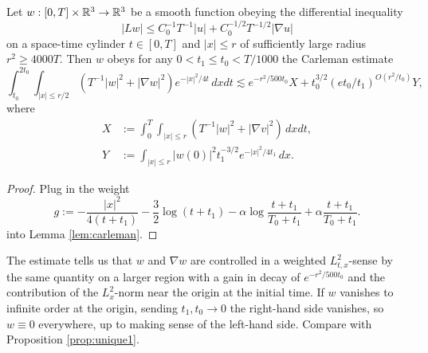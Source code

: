\begin{proposition}
	Let $w : [0, T] \times \mathbb R^3 \to \mathbb R^3$ be a smooth function obeying the differential inequality 
		\[
			|Lw| \leq C_0^{-1} T^{-1} |u| + C_0^{-1/2}T^{-1/2} |\nabla u|
		\]
	on a space-time cylinder $t \in [0, T]$ and $|x| \leq r$ of sufficiently large radius $r^2 \geq 4000 T$. Then $w$ obeys for any $0 < t_1 \leq t_0 < T/1000$ the Carleman estimate
		\[
			\int_{t_0}^{2t_0} \int_{|x| \leq r/2} (T^{-1} |w|^2 + |\nabla w|^2) e^{-|x|^2/4t} \, dx dt \lesssim e^{-r^2/500t_0} X + t_0^{3/2} (et_0/t_1)^{O(r^2/t_0)} Y,
		\]	
	where
		\begin{align*}
			X
				&:= \int_0^T \int_{|x| \leq r} (T^{-1} |w|^2 + |\nabla v|^2) \, dx dt, \\
			Y
				&:= \int_{|x| \leq r} |w(0)|^2 t_1^{-3/2} e^{-|x|^2/4t_1} \, dx.	
		\end{align*}	
\end{proposition}

\begin{proof}
	Plug in the weight
		\[
			g:= - \frac{|x|^2}{4(t + t_1)} - \frac32 \log (t + t_1) - \alpha \log \frac{t + t_1}{T_0 + t_1} + \alpha \frac{t + t_1}{T_0 + t_1}.
		\]
	into Lemma \ref{lem:carleman}. 	
\end{proof}

\begin{remark}
	The estimate tells us that $w$ and $\nabla w$ are controlled in a weighted $L^2_{t, x}$-sense by the same quantity on a larger region with a gain in decay of $e^{-r^2/500t_0}$ and the contribution of the $L^2_x$-norm near the origin at the initial time. If $w$ vanishes to infinite order at the origin, sending $t_1, t_0 \to 0$ the right-hand side vanishes, so $w\equiv 0$ everywhere, up to making sense of the left-hand side. Compare with Proposition \ref{prop:unique1}. 
\end{remark}	

